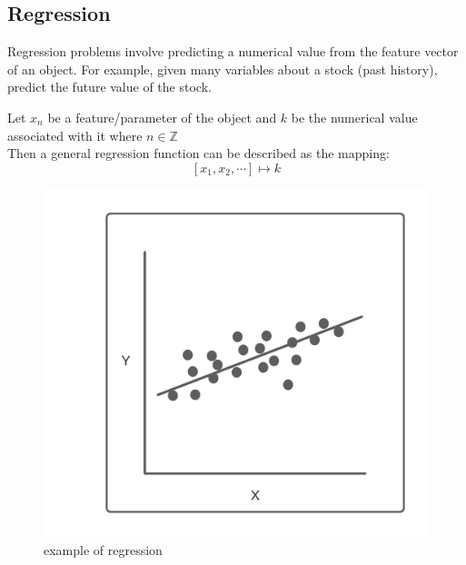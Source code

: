 \documentclass[10pt,a4paper]{report}
\begin{document}
			\subsection{Regression}
				Regression problems involve predicting a numerical value from the feature vector of an object.
				For example, given many variables about a stock (past history), predict the future value of the stock.\par
				Let $x_n$ be a feature/parameter of the object and $k$ be the numerical value associated with it where $n \in \mathbb{Z}$\\
				Then a general regression function can be described as the mapping: \[[x_1,x_2,\cdots] \mapsto k\]
				\begin{figure}[h]
					\centering
					\includegraphics[scale=0.5]{regression-diagram.png}
					\caption{example of regression}
					\label{fig:regression}
				\end{figure}
\end{document}

